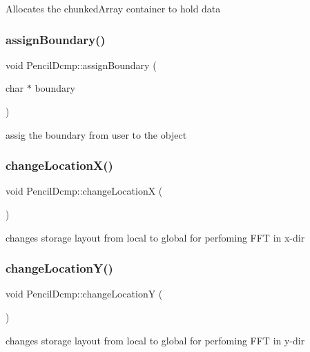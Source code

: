 Allocates the chunked\+Array container to hold data \mbox{\label{classPencilDcmp_abad58d40d070a52c2b2a8e7f90523ec4}} 
\subsubsection{\texorpdfstring{assign\+Boundary()}{assignBoundary()}}
{\footnotesize\ttfamily void Pencil\+Dcmp\+::assign\+Boundary (\begin{DoxyParamCaption}\item[{char $\ast$}]{boundary }\end{DoxyParamCaption})}

assig the boundary from user to the object \mbox{\label{classPencilDcmp_a09f2e5cdf07d70efde9d42c455b61295}} 
\subsubsection{\texorpdfstring{change\+Location\+X()}{changeLocationX()}}
{\footnotesize\ttfamily void Pencil\+Dcmp\+::change\+LocationX (\begin{DoxyParamCaption}{ }\end{DoxyParamCaption})}

changes storage layout from local to global for perfoming F\+FT in x-\/dir \mbox{\label{classPencilDcmp_a47f04f2af8e4fbcc7544d04adf7978d5}} 
\subsubsection{\texorpdfstring{change\+Location\+Y()}{changeLocationY()}}
{\footnotesize\ttfamily void Pencil\+Dcmp\+::change\+LocationY (\begin{DoxyParamCaption}{ }\end{DoxyParamCaption})}

changes storage layout from local to global for perfoming F\+FT in y-\/dir \mbox{\label{classPencilDcmp_a9a135d2665f56ef206861d5b7e0f84be}} 
